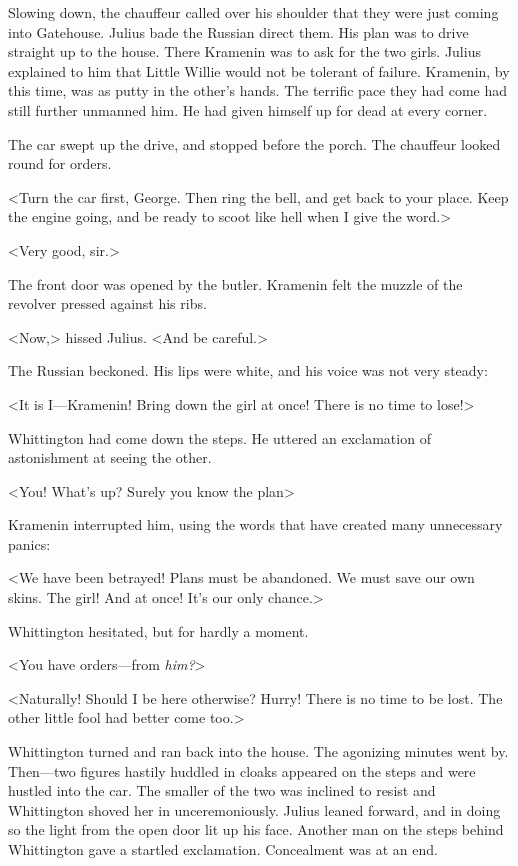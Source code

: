Slowing down, the chauffeur called over his shoulder that they were just coming into Gatehouse. Julius bade the Russian direct them. His plan was to drive straight up to the house. There Kramenin was to ask for the two girls. Julius explained to him that Little Willie would not be tolerant of failure. Kramenin, by this time, was as putty in the other's hands. The terrific pace they had come had still further unmanned him. He had given himself up for dead at every corner.

The car swept up the drive, and stopped before the porch. The chauffeur looked round for orders.

<Turn the car first, George. Then ring the bell, and get back to your place. Keep the engine going, and be ready to scoot like hell when I give the word.>

<Very good, sir.>

The front door was opened by the butler. Kramenin felt the muzzle of the revolver pressed against his ribs.

<Now,> hissed Julius. <And be careful.>

The Russian beckoned. His lips were white, and his voice was not very steady:

<It is I—Kramenin! Bring down the girl at once! There is no time to lose!>

Whittington had come down the steps. He uttered an exclamation of astonishment at seeing the other.

<You! What's up? Surely you know the plan\longdash>

Kramenin interrupted him, using the words that have created many unnecessary panics:

<We have been betrayed! Plans must be abandoned. We must save our own skins. The girl! And at once! It's our only chance.>

Whittington hesitated, but for hardly a moment.

<You have orders—from \emph{him?}>

<Naturally! Should I be here otherwise? Hurry! There is no time to be lost. The other little fool had better come too.>

Whittington turned and ran back into the house. The agonizing minutes went by. Then—two figures hastily huddled in cloaks appeared on the steps and were hustled into the car. The smaller of the two was inclined to resist and Whittington shoved her in unceremoniously. Julius leaned forward, and in doing so the light from the open door lit up his face. Another man on the steps behind Whittington gave a startled exclamation. Concealment was at an end.

